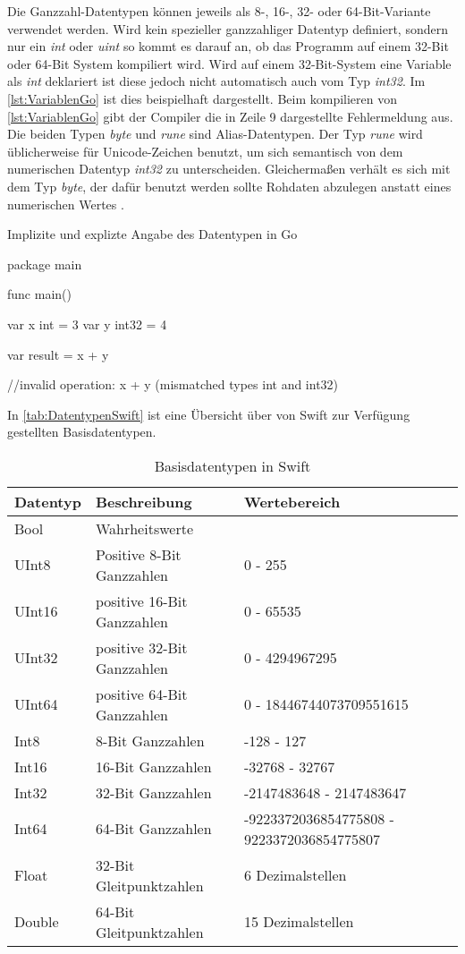 Die Ganzzahl-Datentypen können jeweils als 8-, 16-, 32- oder 64-Bit-Variante verwendet werden. 
Wird kein spezieller ganzzahliger Datentyp definiert, sondern nur ein \emph{int} oder \emph{uint} so kommt es darauf an, ob das Programm auf einem 32-Bit oder 64-Bit System kompiliert wird.
Wird auf einem 32-Bit-System eine Variable als \emph{int} deklariert ist diese jedoch nicht automatisch auch vom Typ \emph{int32}.
Im \autoref{lst:VariablenGo} ist dies beispielhaft dargestellt. 
Beim kompilieren von \autoref{lst:VariablenGo} gibt der Compiler die in Zeile 9 dargestellte Fehlermeldung aus. 
Die beiden Typen \emph{byte} und \emph{rune} sind Alias-Datentypen.
Der Typ \emph{rune} wird üblicherweise für Unicode-Zeichen benutzt, um sich semantisch von dem numerischen Datentyp \emph{int32} zu unterscheiden. 
Gleichermaßen verhält es sich mit dem Typ \emph{byte}, der dafür benutzt werden sollte Rohdaten abzulegen anstatt eines numerischen Wertes \cite[S.98]{Kennedy.2016}.

\begin{listing}[H]
\caption{Implizite und explizte Angabe des Datentypen in Go}
\label{lst:VariablenGo}
\begin{GoCode}
package main

func main() {
    var x int = 3
    var y int32 = 4

    var result = x + y	
}
//invalid operation: x + y (mismatched types int and int32)
\end{GoCode}
\end{listing}

In \autoref{tab:DatentypenSwift} ist eine Übersicht über von Swift zur Verfügung gestellten Basisdatentypen. 

\begin{table}[h]
\centering
\begin{tabularx}{\textwidth}{|l|X|X|}
 \hline 
 \rowcolor[gray]{0.75} \textbf{Datentyp} & \textbf{Beschreibung} & \textbf{Wertebereich} \\
 \hline
 Bool & Wahrheitswerte & \\ 
 \hline 
 UInt8 & Positive 8-Bit Ganzzahlen & 0 - 255\\
 \hline 
 UInt16	& positive 16-Bit Ganzzahlen & 0 - 65535\\
 \hline
 UInt32 & positive 32-Bit Ganzzahlen & 0 - 4294967295\\
 \hline
 UInt64	& positive 64-Bit Ganzzahlen & 0 - 18446744073709551615\\
 \hline
 Int8 & 8-Bit Ganzzahlen & -128 - 127 \\
 \hline
 Int16 & 16-Bit Ganzzahlen & -32768 - 32767 \\
 \hline
 Int32 & 32-Bit Ganzzahlen & -2147483648 - 2147483647 \\
 \hline
 Int64 & 64-Bit Ganzzahlen & -9223372036854775808 - 9223372036854775807 \\
 \hline
 Float & 32-Bit Gleitpunktzahlen & 6 Dezimalstellen \\
 \hline 
 Double & 64-Bit Gleitpunktzahlen & 15 Dezimalstellen \\
 \hline
\end{tabularx}
\caption{Basisdatentypen in Swift}
\label{tab:DatentypenSwift}
\end{table}

